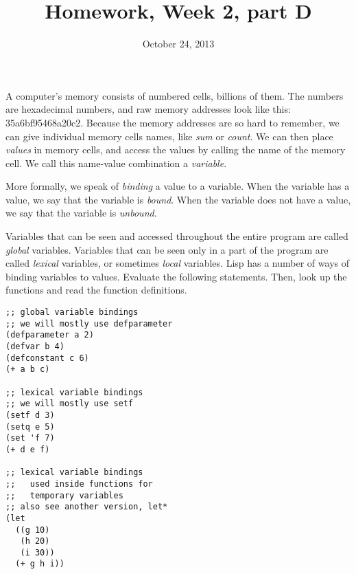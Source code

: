 \documentclass{article}
\title{Homework, Week 2, part D}
\date{October 24, 2013}
\begin{document}
\maketitle{}

A computer's memory consists of numbered cells, billions of them. The numbers are hexadecimal numbers, and raw memory addresses look like this: 35a6bf95468a20c2. Because the memory addresses are so hard to remember, we can give individual memory cells names, like \textit{sum} or \textit{count}. We can then place \textit{values} in memory cells, and access the values by calling the name of the memory cell. We call this name-value combination a \textit{variable}.

More formally, we speak of \textit{binding} a value to a variable. When the variable has a value, we say that the variable is \textit{bound}. When the variable does not have a value, we say that the variable is \textit{unbound}.

Variables that can be seen and accessed throughout the entire program are called \textit{global} variables. Variables that can be seen only in a part of the program are called \textit{lexical} variables, or sometimes \textit{local} variables. Lisp has a number of ways of binding variables to values. Evaluate the following statements. Then, look up the functions and read the function definitions.
\lstset{language=Lisp,numbers=left,keepspaces=true,basicstyle=\small,numberstyle=\tiny,showstringspaces=false,breaklines=true}
\begin{lstlisting}
;; global variable bindings
;; we will mostly use defparameter
(defparameter a 2)
(defvar b 4)
(defconstant c 6)
(+ a b c)

;; lexical variable bindings
;; we will mostly use setf
(setf d 3)
(setq e 5)
(set 'f 7)
(+ d e f)

;; lexical variable bindings
;;   used inside functions for
;;   temporary variables
;; also see another version, let*
(let 
  ((g 10)
   (h 20)
   (i 30))
  (+ g h i)) 
\end{lstlisting}
\end{document}
